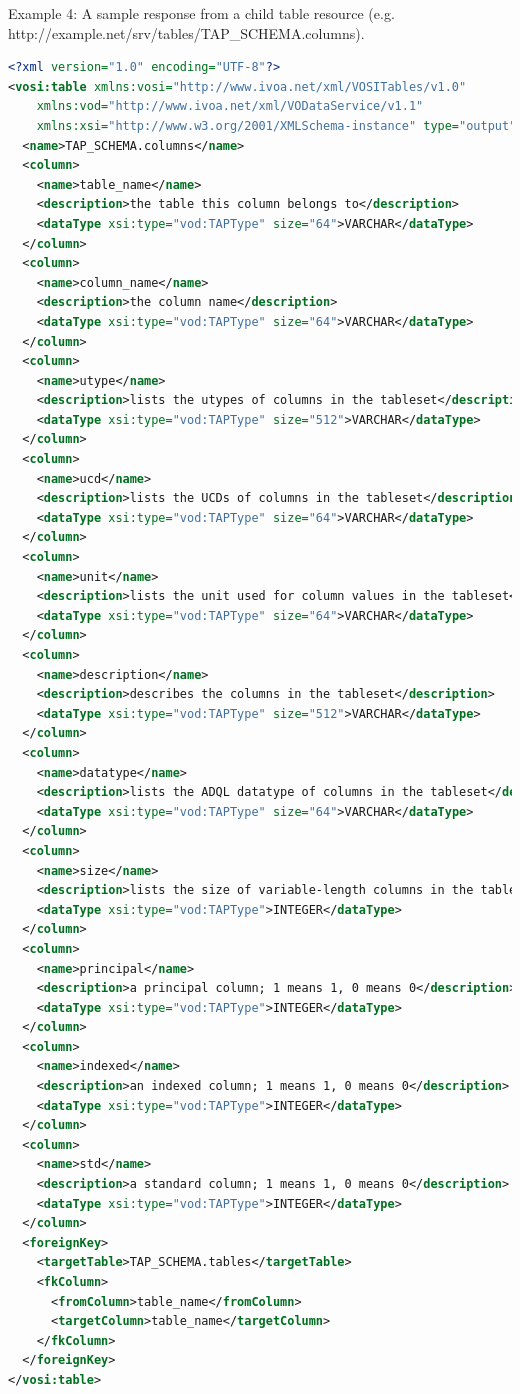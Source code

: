 \documentclass[11pt,letter]{ivoa}
\begin{document}
Example 4:
A sample response from a child table resource (e.g. http://example.net/srv/tables/TAP\_SCHEMA.columns).

\begin{lstlisting}[language=XML]
<?xml version="1.0" encoding="UTF-8"?>
<vosi:table xmlns:vosi="http://www.ivoa.net/xml/VOSITables/v1.0" 
    xmlns:vod="http://www.ivoa.net/xml/VODataService/v1.1" 
    xmlns:xsi="http://www.w3.org/2001/XMLSchema-instance" type="output">
  <name>TAP_SCHEMA.columns</name>
  <column>
    <name>table_name</name>
    <description>the table this column belongs to</description>
    <dataType xsi:type="vod:TAPType" size="64">VARCHAR</dataType>
  </column>
  <column>
    <name>column_name</name>
    <description>the column name</description>
    <dataType xsi:type="vod:TAPType" size="64">VARCHAR</dataType>
  </column>
  <column>
    <name>utype</name>
    <description>lists the utypes of columns in the tableset</description>
    <dataType xsi:type="vod:TAPType" size="512">VARCHAR</dataType>
  </column>
  <column>
    <name>ucd</name>
    <description>lists the UCDs of columns in the tableset</description>
    <dataType xsi:type="vod:TAPType" size="64">VARCHAR</dataType>
  </column>
  <column>
    <name>unit</name>
    <description>lists the unit used for column values in the tableset</description>
    <dataType xsi:type="vod:TAPType" size="64">VARCHAR</dataType>
  </column>
  <column>
    <name>description</name>
    <description>describes the columns in the tableset</description>
    <dataType xsi:type="vod:TAPType" size="512">VARCHAR</dataType>
  </column>
  <column>
    <name>datatype</name>
    <description>lists the ADQL datatype of columns in the tableset</description>
    <dataType xsi:type="vod:TAPType" size="64">VARCHAR</dataType>
  </column>
  <column>
    <name>size</name>
    <description>lists the size of variable-length columns in the tableset</description>
    <dataType xsi:type="vod:TAPType">INTEGER</dataType>
  </column>
  <column>
    <name>principal</name>
    <description>a principal column; 1 means 1, 0 means 0</description>
    <dataType xsi:type="vod:TAPType">INTEGER</dataType>
  </column>
  <column>
    <name>indexed</name>
    <description>an indexed column; 1 means 1, 0 means 0</description>
    <dataType xsi:type="vod:TAPType">INTEGER</dataType>
  </column>
  <column>
    <name>std</name>
    <description>a standard column; 1 means 1, 0 means 0</description>
    <dataType xsi:type="vod:TAPType">INTEGER</dataType>
  </column>
  <foreignKey>
    <targetTable>TAP_SCHEMA.tables</targetTable>
    <fkColumn>
      <fromColumn>table_name</fromColumn>
      <targetColumn>table_name</targetColumn>
    </fkColumn>
  </foreignKey>
</vosi:table>
\end{lstlisting}
\end{document}
